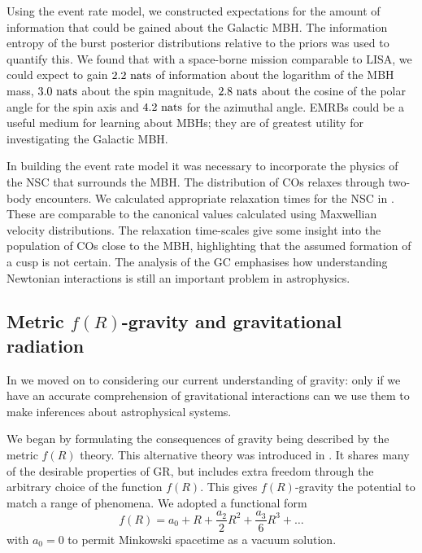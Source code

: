 Using the event rate model, we constructed expectations for the amount of information that could be gained about the Galactic MBH. The information entropy of the burst posterior distributions relative to the priors was used to quantify this. We found that with a space-borne mission comparable to LISA, we could expect to gain $2.2~\mathrm{nats}$ of information about the logarithm of the MBH mass, $3.0~\mathrm{nats}$ about the spin magnitude, $2.8~\mathrm{nats}$ about the cosine of the polar angle for the spin axis and $4.2~\mathrm{nats}$ for the azimuthal angle. EMRBs could be a useful medium for learning about MBHs; they are of greatest utility for investigating the Galactic MBH.

In building the event rate model it was necessary to incorporate the physics of the NSC that surrounds the MBH. The distribution of COs relaxes through two-body encounters. We calculated appropriate relaxation times for the NSC in . These are comparable to the canonical values calculated using Maxwellian velocity distributions. The relaxation time-scales give some insight into the population of COs close to the MBH, highlighting that the assumed formation of a cusp is not certain. The analysis of the GC emphasises how understanding Newtonian interactions is still an important problem in astrophysics.

\subsection{Metric $f(R)$-gravity and gravitational radiation}\label{sec:Review-f-R}

In  we moved on to considering our current understanding of gravity: only if we have an accurate comprehension of gravitational interactions can we use them to make inferences about astrophysical systems.

We began by formulating the consequences of gravity being described by the metric $f(R)$ theory. This alternative theory was introduced in . It shares many of the desirable properties of GR, but includes extra freedom through the arbitrary choice of the function $f(R)$. This gives $f(R)$-gravity the potential to match a range of phenomena. We adopted a functional form
\begin{equation}
f(R) = a_0 + R + \frac{a_2}{2}R^2 + \frac{a_3}{6}R^3 + \ldots
\end{equation}
with $a_0 = 0$ to permit Minkowski spacetime as a vacuum solution.

